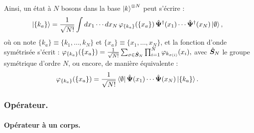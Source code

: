 Ainsi, un état à \(N\) bosons dans la base \( \ket{k}^{\otimes N} \) peut s’écrire :
\begin{eqnarray}
	\ket{\{k_a\}} = \frac{1}{\sqrt{N!}} \int dx_1 \cdots dx_N \, \varphi_{\{k_a\}} ( \{x_a\} ) \, \hat{\bm{\Psi}}^\dag(x_1) \cdots \hat{\bm{\Psi}}^\dag(x_N) \ket{\emptyset},
\end{eqnarray}
où on note \( \{k_a\} \equiv \{k_1, \dots, k_N\} \) et \( \{x_a\} \equiv \{x_1, \dots, x_N\} \), et la fonction d’onde symétrisée s’écrit :
\(
	\varphi_{\{k_a\}} ( \{x_a\} ) = \frac{1}{\sqrt{N!}} \sum_{\sigma \in \hat{\bm{S}}_N } \prod_{i=1}^N \varphi_{k_{\sigma(i)}}(x_i),
\) 
avec $\hat{\bm{S}}_N $  le groupe symétrique d'ordre $N$, ou encore, de manière équivalente :
\begin{eqnarray}\label{chap.1:eq.rapel.fonction.propre.N}
	\varphi_{\{k_a\}} (\{x_a\}) = \frac{1}{\sqrt{N!}} \bra{\emptyset} \hat{\bm{\Psi}}(x_1) \cdots \hat{\bm{\Psi}}(x_N) \ket{\{k_a\}}.
\end{eqnarray}



\subsubsection{Opérateur. }


\paragraph{Opérateur à un corps.}

